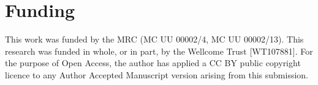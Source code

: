 \documentclass{article}
\begin{document}
\section*{Funding}
This work was funded by the MRC (MC UU 00002/4, MC UU 00002/13). This research was funded in whole, or in part, by the Wellcome Trust [WT107881]. For the purpose of Open Access, the author has applied a CC BY public copyright licence to any Author Accepted Manuscript version arising from this submission.
\vspace*{-12pt}

%
%

%
%
%
%
%
%
  









\end{document}
